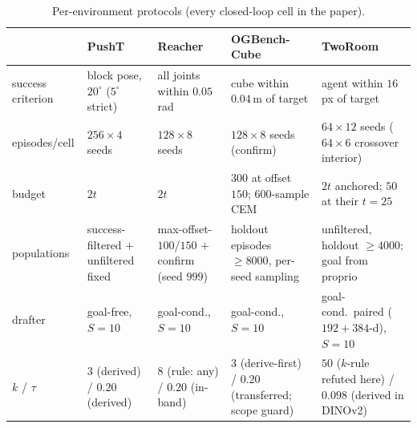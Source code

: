 \documentclass{article}
\newcommand{\degc}[1]{$#1^\circ$}
\begin{document}
\begin{table}[h]
\centering
\small
\setlength{\tabcolsep}{4pt}
\caption{Per-environment protocols (every closed-loop cell in the paper).}
\label{tab:protocols}
\footnotesize
\begin{tabular}{lp{2.2cm}p{2.4cm}p{3.0cm}p{2.85cm}}
\toprule
& PushT & Reacher & OGBench-Cube & TwoRoom \\
\midrule
success criterion & block pose, \degc{20} (\degc{5} strict) & all joints within $0.05$\,rad & cube within $0.04$\,m of target & agent within $16$\,px of target \\
episodes/cell & $256\times4$ seeds & $128\times8$ seeds & $128\times8$ seeds (confirm) & $64\times12$ seeds ($64\times6$ crossover interior) \\
budget & $2t$ & $2t$ & $300$ at offset $150$; $600$-sample CEM & $2t$ anchored; $50$ at their $t{=}25$ \\
populations & success-filtered $+$ unfiltered fixed & max-offset-$100$/$150$ $+$ confirm (seed $999$) & holdout episodes ${\ge}8000$, per-seed sampling & unfiltered, holdout ${\ge}4000$; goal from proprio \\
drafter & goal-free, $S{=}10$ & goal-cond., $S{=}10$ & goal-cond., $S{=}10$ & goal-cond.\ paired ($192{+}384$-d), $S{=}10$ \\
$k$ / $\tau$ & $3$ (derived) / $0.20$ (derived) & $8$ (rule: any) / $0.20$ (in-band) & $3$ (derive-first) / $0.20$ (transferred; scope guard) & $50$ ($k$-rule refuted here) / $0.098$ (derived in DINOv2) \\
\bottomrule
\end{tabular}
\end{table}
\end{document}
